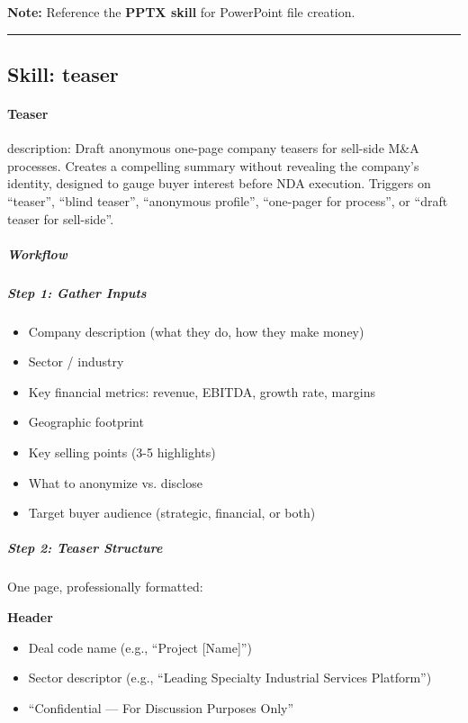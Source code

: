 \documentclass[11pt]{article}
\begin{document}
\textbf{Note:} Reference the \textbf{PPTX skill} for PowerPoint file creation.


\vspace{0.8em}\hrule\vspace{0.8em}

\subsection{Skill: teaser}\label{file:skills-teaser-SKILL.md}

\paragraph{Teaser}\mbox{}\par

description: Draft anonymous one-page company teasers for sell-side M\&A processes. Creates a compelling summary without revealing the company's identity, designed to gauge buyer interest before NDA execution. Triggers on ``teaser'', ``blind teaser'', ``anonymous profile'', ``one-pager for process'', or ``draft teaser for sell-side''.


\subparagraph{Workflow}\mbox{}\par

\subparagraph{Step 1: Gather Inputs}\mbox{}\par

\begin{itemize}[leftmargin=*,itemsep=2pt,topsep=2pt]
\item {} Company description (what they do, how they make money)
\item {} Sector / industry
\item {} Key financial metrics: revenue, EBITDA, growth rate, margins
\item {} Geographic footprint
\item {} Key selling points (3-5 highlights)
\item {} What to anonymize vs. disclose
\item {} Target buyer audience (strategic, financial, or both)
\end{itemize}

\subparagraph{Step 2: Teaser Structure}\mbox{}\par

One page, professionally formatted:


\textbf{Header}

\begin{itemize}[leftmargin=*,itemsep=2pt,topsep=2pt]
\item {} Deal code name (e.g., ``Project [Name]'')
\item {} Sector descriptor (e.g., ``Leading Specialty Industrial Services Platform'')
\item {} ``Confidential — For Discussion Purposes Only''
\end{itemize}
\end{document}
